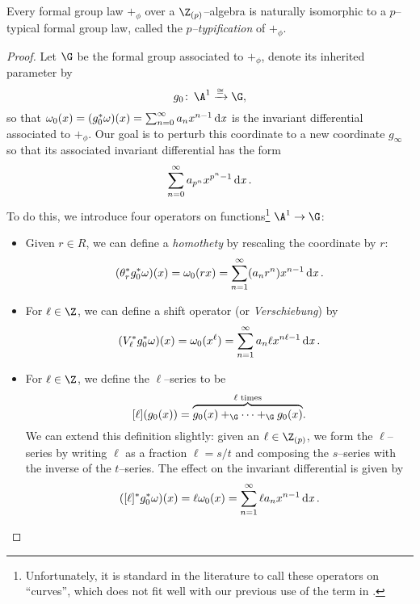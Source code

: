 \begin{lemma}\label{EveryLogHaspTypification}\label{EveryFGLIsPTypical}
Every formal group law \(+_\phi\) over a \(\Z_{(p)}\)--algebra is naturally isomorphic to a \(p\)--typical formal group law, called the \textit{\(p\)--typification} of \(+_\phi\).
\end{lemma}
\begin{proof}
Let \(\G\) be the formal group associated to \(+_\phi\), denote its inherited parameter by \[g_0\co \A^1 \xrightarrow{\cong} \G,\] so that \(\omega_0(x) = (g_0^* \omega)(x) = \sum_{n=0}^\infty a_n x^{n-1} \operatorname{d\mathit{x}}\) is the invariant differential associated to \(+_\phi\).  Our goal is to perturb this coordinate to a new coordinate \(g_\infty\) so that its associated invariant differential has the form \[\sum_{n=0}^\infty a_{p^n} x^{p^n-1} \operatorname{d\mathit{x}}.\]  To do this, we introduce four operators on functions\footnote{Unfortunately, it is standard in the literature to call these operators on ``curves'', which does not fit well with our previous use of the term in .} \(\A^1 \to \G\):
\begin{itemize}
\item Given \(r \in R\), we can define a \textit{homothety} by rescaling the coordinate by \(r\): \[(\theta_r^* g_0^* \omega)(x) = \omega_0(rx) = \sum_{n=1}^\infty (a_n r^n) x^{n-1} \operatorname{d\mathit{x}}.\]
\item For \(\ell \in \Z\), we can define a shift operator (or \textit{Verschiebung}) by \[(V_\ell^* g_0^* \omega)(x) = \omega_0(x^\ell) = \sum_{n=1}^\infty a_n \ell x^{n \ell - 1} \operatorname{d\mathit{x}}.\]
\item For \(\ell \in \Z\), we define the \(\ell\)--series to be \[[\ell](g_0(x)) = \overset{\text{\(\ell\) times}}{\overbrace{g_0(x) +_{\G} \cdots +_{\G} g_0(x)}}.\]  We can extend this definition slightly: given an \(\ell \in \Z_{(p)}\), we form the \(\ell\)--series by writing \(\ell\) as a fraction \(\ell = s/t\) and composing the \(s\)--series with the inverse of the \(t\)--series.  The effect on the invariant differential is given by \[([\ell]^* g_0^* \omega)(x) = \ell \omega_0(x) = \sum_{n=1}^\infty \ell a_n x^{n-1} \operatorname{d\mathit{x}}.\]

\end{itemize}
\end{proof}

